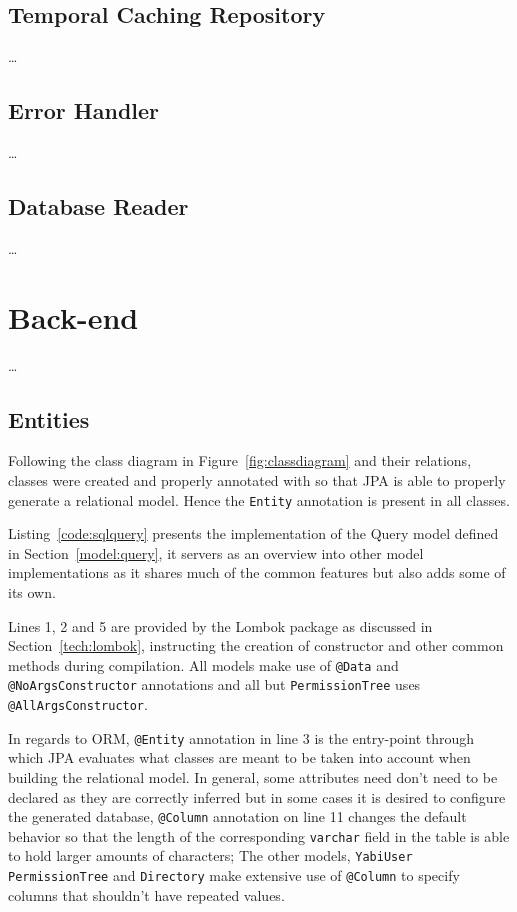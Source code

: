 \subsection{Temporal Caching Repository}
\dots
\subsection{Error Handler}
\dots
\subsection{Database Reader}
\dots

\section{Back-end}\label{cha:implementation:sec:back-end}
\dots

\subsection{Entities}
Following the class diagram in Figure~\ref{fig:classdiagram} and their relations, classes were created and properly annotated with so that \gls{JPA} is able to properly generate a relational model. Hence the \texttt{Entity} annotation is present in all classes.

Listing~\ref{code:sqlquery} presents the implementation of the Query model defined in Section~\ref{model:query}, it servers as an overview into other model implementations as it shares much of the common features but also adds some of its own.

Lines 1, 2 and 5 are provided by the Lombok package as discussed in Section~\ref{tech:lombok}, instructing the creation of constructor and other common methods during compilation. All models make use of \texttt{@Data} and \texttt{@NoArgsConstructor} annotations and all but \texttt{PermissionTree} uses \texttt{@AllArgsConstructor}.

In regards to \gls{ORM}, \texttt{@Entity} annotation in line 3 is the entry-point through which \gls{JPA} evaluates what classes are meant to be taken into account when building the relational model.
In general, some attributes need don't need to be declared as they are correctly inferred but in some cases it is desired to configure the generated database, \texttt{@Column} annotation on line 11 changes the default behavior so that the length of the corresponding \texttt{varchar} field in the table is able to hold larger amounts of characters; The other models, \texttt{YabiUser} \texttt{PermissionTree} and \texttt{Directory} make extensive use of \texttt{@Column} to specify columns that shouldn't have repeated values.

